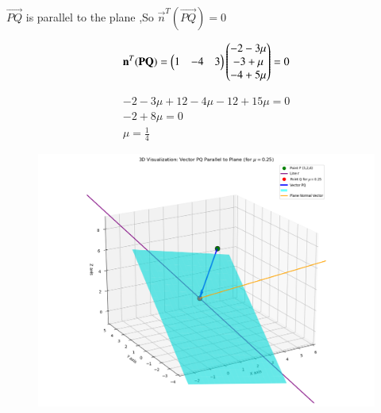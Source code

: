 \documentclass[journal]{IEEEtran}
\begin{document}
$\overrightarrow{PQ}$ is parallel to the plane ,So $\vec{n}^{T}(\vec{PQ})=0$

\begin{align}
   \mathbf{n}^{T}(\mathbf{PQ})= \begin{pmatrix} 1 & -4 & 3 \end{pmatrix} \begin{pmatrix} -2-3\mu\\ -3+\mu \\ -4+5\mu \end{pmatrix} =0
\end{align}

\begin{align}
    -2-3\mu+12-4\mu-12+15\mu=0\\
    -2+8\mu=0\\
    \mu=\frac{1}{4}
\end{align}


\begin{figure}
    \centering
    \includegraphics[width=1\linewidth]{figs/Plane1.png}
    \caption{}
    \label{fig:placeholder}
\end{figure}
\end{document}
